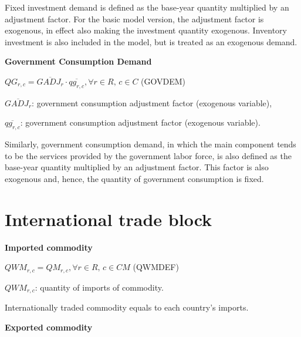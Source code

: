 \documentclass[10pt,a4paper,titlepage,dvipdfmx]{book}
\begin{document}
Fixed investment demand is defined as the base-year quantity multiplied by an adjustment factor. For the basic model version, the adjustment factor is exogenous, in effect also making the investment quantity exogenous. Inventory investment is also included in the model, but is treated as an exogenous demand.

\begin{flushleft}\textbf{Government Consumption Demand}\end{flushleft}


\begin{center}$QG_{r,c}=\overline{GADJ_{r}}\cdot \overline{qg_{r,c}},\forall r\in R,\,c\in C$ (GOVDEM)
\end{center}

\begin{flushleft}
$\overline{GADJ_{r}}$: government consumption adjustment factor (exogenous variable),

$\overline{qg_{r,c}}$: government consumption adjustment factor (exogenous variable).
\end{flushleft}

Similarly, government consumption demand, in which the main component tends to be the services provided by the government labor force, is also defined as the base-year quantity multiplied by an adjustment factor. This factor is also exogenous and, hence, the quantity of government consumption is fixed.

\section{\label{sec:IntTraBlo}International trade block}

\begin{flushleft}\textbf{Imported commodity}\end{flushleft}


\begin{center}$QWM_{r,c}=QM_{r,c},\forall r\in R,\,c\in CM$ (QWMDEF)
\end{center}

\begin{flushleft} $QWM_{r,c}$: quantity of imports of commodity. \end{flushleft}

Internationally traded commodity equals to each country's imports.

\begin{flushleft}\textbf{Exported commodity}\end{flushleft}
\end{document}
